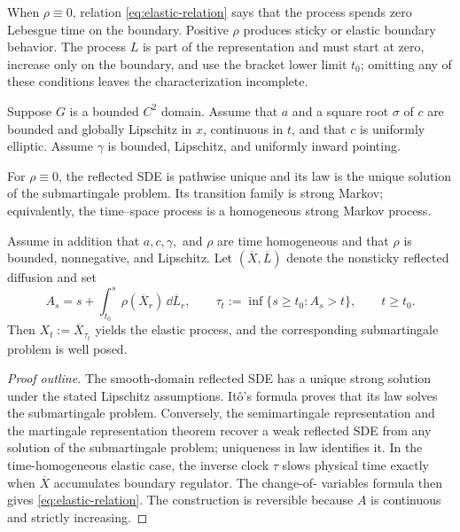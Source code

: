 \begin{remark}
When $\rho\equiv0$, relation \eqref{eq:elastic-relation} says that the process
spends zero Lebesgue time on the boundary. Positive $\rho$ produces sticky or
elastic boundary behavior. The process $L$ is part of the representation and
must start at zero, increase only on the boundary, and use the bracket lower
limit $t_0$; omitting any of these conditions leaves the characterization
incomplete.
\end{remark}

\begin{theorem}
Suppose $G$ is a bounded $C^2$ domain. Assume that $a$ and a square root
$\sigma$ of $c$ are bounded and globally Lipschitz in $x$, continuous in
$t$, and that $c$ is uniformly elliptic. Assume $\gamma$ is bounded,
Lipschitz, and uniformly inward pointing.

For $\rho\equiv0$, the reflected SDE is pathwise unique and its law is the
unique solution of the submartingale problem. Its transition family is strong
Markov; equivalently, the time--space process is a homogeneous strong Markov
process.

Assume in addition that $a,c,\gamma,$ and $\rho$ are time homogeneous and
that $\rho$ is bounded, nonnegative, and Lipschitz. Let
$(\overline X,\overline L)$ denote the nonsticky reflected diffusion and set
\[
  A_s=s+\int_{t_0}^s\rho(\overline X_r)\,\dd\overline L_r,
  \qquad
  \tau_t:=\inf\{s\geq t_0:A_s>t\},
  \qquad t\geq t_0.
\]
Then $X_t:=\overline X_{\tau_t}$ yields the elastic process, and the
corresponding submartingale problem is well posed.
\end{theorem}

\begin{proof}[Proof outline]
The smooth-domain reflected SDE has a unique strong solution under the stated
Lipschitz assumptions. It\^o's formula proves that its law solves the
submartingale problem. Conversely, the semimartingale representation and the
martingale representation theorem recover a weak reflected SDE from any
solution of the submartingale problem; uniqueness in law identifies it. In the
time-homogeneous elastic case, the inverse clock $\tau$ slows physical time
exactly when $\overline X$ accumulates boundary regulator. The change-of-
variables formula then gives \eqref{eq:elastic-relation}. The construction is
reversible because $A$ is continuous and strictly increasing.
\end{proof}

